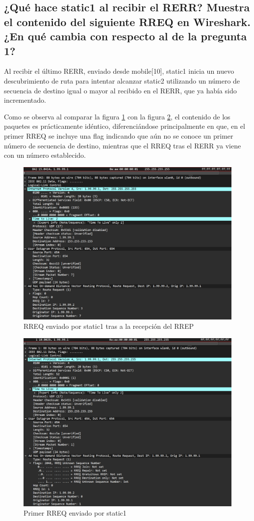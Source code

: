 \subsection{¿Qué hace static1 al recibir el RERR? Muestra el contenido del siguiente RREQ en Wireshark. ¿En qué cambia
con respecto al de la pregunta 1?}

Al recibir el último RERR, enviado desde mobile[10], static1 inicia un nuevo descubrimiento de ruta para intentar alcanzar static2 utilizando un número de secuencia de destino igual o mayor al recibido en el RERR, que ya había sido incrementado.

Como se observa al comparar la figura \ref{fig:RREQstatic1} con la figura \ref{fig:PrimerRREQstatic1}, el contenido de los paquetes es prácticamente idéntico, diferenciándose principalmente en que, en el primer RREQ se incluye una flag indicando que aún no se conoce un primer número de secuencia de destino, mientras que el RREQ tras el RERR ya viene con un número establecido.

\begin{figure}[H]
    \centering
    \includegraphics[width=125mm, scale=0.75]{imaxes/aodv/ejercicio8_1.png}
    \caption{RREQ enviado por static1 tras a la recepción del RREP}
    \label{fig:RREQstatic1}
\end{figure}

\begin{figure}[H]
    \centering
    \includegraphics[width=125mm, scale=0.75]{imaxes/aodv/ejercicio8_2.png}
    \caption{Primer RREQ enviado por static1}
    \label{fig:PrimerRREQstatic1}
\end{figure}